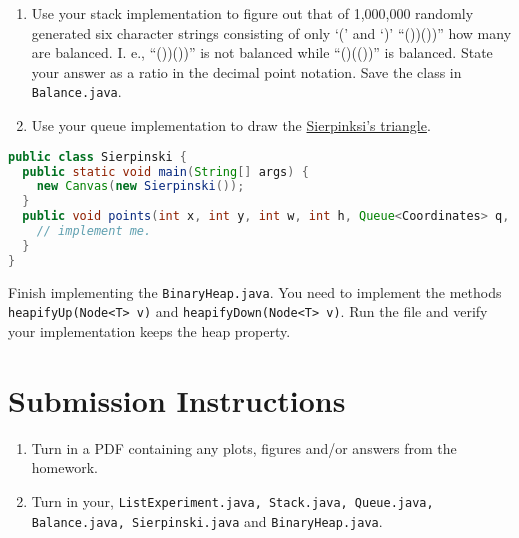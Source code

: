 \documentclass{homework}
\begin{document}
\begin{enumerate}
  \item Use your stack implementation to figure out that of 1,000,000
        randomly generated six character strings consisting of only `('
        and `)' \eg ``())())'' how many are balanced. I. e., ``())())'' is
        not balanced while ``()(())'' is balanced. State your answer as a
        ratio in the decimal point notation. Save the class in
        \texttt{Balance.java}.
  \item Use your queue implementation to draw the
        \href{https://en.wikipedia.org/wiki/Sierpi%C5%84ski_triangle}{Sierpinksi's triangle}.
\end{enumerate}

\begin{lstlisting}[language=Java]
public class Sierpinski {
  public static void main(String[] args) {
    new Canvas(new Sierpinski());
  }
  public void points(int x, int y, int w, int h, Queue<Coordinates> q, int r) {
    // implement me.
  }
}
\end{lstlisting}

\question \sloppy Finish implementing the \texttt{BinaryHeap.java}. You need to implement the methods \\
\texttt{heapifyUp(Node<T> v)} and
\texttt{heapifyDown(Node<T> v)}. Run the file and verify your implementation keeps the heap property.

\section*{Submission Instructions}

\begin{enumerate}
  \item Turn in a PDF containing any plots, figures and/or answers from
        the homework.
  \item Turn in your, \texttt{ListExperiment.java, Stack.java, Queue.java, Balance.java, Sierpinski.java} and \texttt{BinaryHeap.java}.
\end{enumerate}
\end{document}
